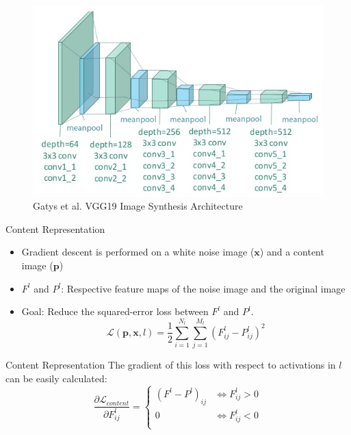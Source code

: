 \documentclass{beamer}
\begin{document}
\begin{frame}
\begin{figure}[H]
\centering
\caption{Gatys et al. VGG19 Image Synthesis Architecture}
\includegraphics[width=\textwidth]{img/vgg19/synthesis}
\end{figure}
\end{frame}

\begin{frame}{Content Representation}
    \begin{itemize}
        \item Gradient descent is performed on a white noise image
            ($\mathbf{x}$) and a content image
            ($\mathbf{p}$)
        \item $F^l$ and $P^l$: Respective feature maps of the
            noise image and the original image
        \item Goal: Reduce the squared-error loss between $F^l$ and $P^l$.
    \begin{equation}
        \mathcal{L}(\mathbf{p}, \mathbf{x}, l) =
        \frac{1}{2} \sum_{i=1}^{N_l}\sum_{j=1}^{M_l}{(F^l_{ij} - P^l_{ij})^2}
    \end{equation}
    \end{itemize}
\end{frame}

\begin{frame}{Content Representation}
    The gradient of this loss with respect to activations in $l$ can be easily
    calculated:
    \begin{equation}
        \frac{\partial \mathcal{L}_{content}}{\partial F^l_{ij}}
        =
        \begin{cases}
            (F^l - P^l)_{ij} & \iff F^l_{ij} > 0 \\
            0 & \iff F^l_{ij} < 0 \\
        \end{cases}
    \end{equation}
\end{frame}
\end{document}
